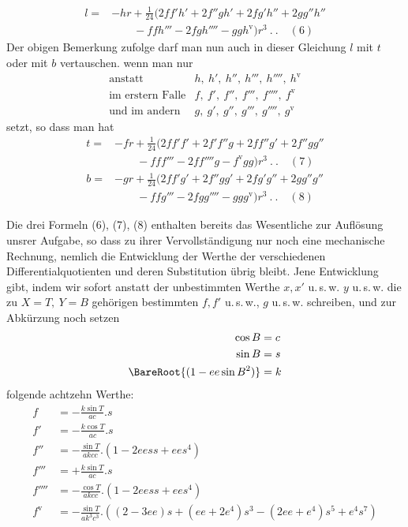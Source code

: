 %
\[
\begin{aligned}
l={}&-hr+\tfrac1{24}(2ff'h'+2f''gh'+2fg'h''+2gg''h''\\
&\qquad-ffh'''-2fgh''''-ggh^{\mathrm{v}})r^3\ .\ .\quad(6)
\end{aligned}
\]
Der obigen Bemerkung zufolge darf man nun auch in dieser Gleichung \(l\) mit \(t\) oder mit \(b\) vertauschen. wenn man nur
\[
\begin{array}{rl}
\text{anstatt}&h,\ h',\ h'',\ h''',\ h'''',\ h^{\mathrm{v}}\\
\text{im erstern Falle}&f,\ f',\ f'',\ f''',\ f'''',\ f^{\mathrm{v}}\\
\text{und im andern}&g,\ g',\ g'',\ g''',\ g'''',\ g^{\mathrm{v}}
\end{array}
\]
setzt, so dass man hat
\[
\begin{aligned}
t={}&-fr+\tfrac1{24}(2ff'f'+2f'f''g+2ff''g'+2f''gg''\\
&\qquad-fff'''-2ff''''g-f^{\mathrm{v}}gg)r^3\ .\ .\quad(7)\\
b={}&-gr+\tfrac1{24}(2ff'g'+2f''gg'+2fg'g''+2gg''g''\\
&\qquad-ffg'''-2fgg''''-ggg^{\mathrm{v}})r^3\ .\ .\quad(8)
\end{aligned}
\]

Die drei Formeln (6), (7), (8) enthalten bereits das Wesentliche zur Auflösung unsrer Aufgabe, so dass zu ihrer Vervollständigung nur noch eine mechanische Rechnung, nemlich die Entwicklung der Werthe der verschiedenen Differentialquotienten und deren Substitution übrig bleibt. Jene Entwicklung gibt, indem wir sofort anstatt der unbestimmten Werthe \(x,x'\) u.\,s.\,w. \(y\) u.\,s.\,w. die zu \(X=T,\ Y=B\) gehörigen bestimmten \(f,f'\) u.\,s.\,w., \(g\) u.\,s.\,w. schreiben, und zur Abkürzung noch setzen
\[
\begin{aligned}
\cos B&=c\\
\sin B&=s\\
\BareRoot{(1-ee\sin B^2)}&=k
\end{aligned}
\]
folgende achtzehn Werthe:
\[
\begin{aligned}
f&=-\frac{k\sin T}{ac}\mathord{.}s\\
f'&=-\frac{k\cos T}{ac}\mathord{.}s\\
f''&=-\frac{\sin T}{akcc}\mathord{.}(1-2eess+ees^4)\\
f'''&=+\frac{k\sin T}{ac}\mathord{.}s\\
f''''&=-\frac{\cos T}{akcc}\mathord{.}(1-2eess+ees^4)\\
f^{\mathrm{v}}&=-\frac{\sin T}{ak^3c^3}\mathord{.}((2-3ee)s+(ee+2e^4)s^3-(2ee+e^4)s^5+e^4s^7)
\end{aligned}
\]
